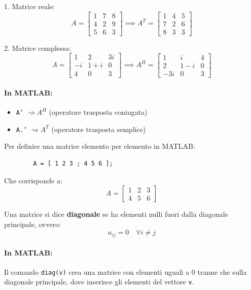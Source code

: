 \documentclass[a4paper,12pt]{article}
\begin{document}
	1. Matrice reale:
	\[
	A = \begin{bmatrix} 1 & 7 & 8 \\ 4 & 2 & 9 \\ 5 & 6 & 3 \end{bmatrix} \implies A^T = \begin{bmatrix} 1 & 4 & 5 \\ 7 & 2 & 6 \\ 8 & 3 & 3 \end{bmatrix}
	\]
	
	2. Matrice complessa:
	\[
	A = \begin{bmatrix} 1 & 2 & 3i \\ -i & 1+i & 0 \\ 4 & 0 & 3 \end{bmatrix} \implies A^H = \begin{bmatrix} 1 & i & 4 \\ 2 & 1-i & 0 \\ -3i & 0 & 3 \end{bmatrix}
	\]
	
	\paragraph{In MATLAB:}
	\begin{itemize}
		\item \texttt{A'} $\rightsquigarrow A^H$ (operatore trasposta coniugata)
		\item \texttt{A.'} $\rightsquigarrow A^T$ (operatore trasposta semplice)
	\end{itemize}
	
	Per definire una matrice elemento per elemento in MATLAB:
	\begin{verbatim}
		A = [ 1 2 3 ; 4 5 6 ];
	\end{verbatim}
	Che corrisponde a:
	\[
	A = \begin{bmatrix} 1 & 2 & 3 \\ 4 & 5 & 6 \end{bmatrix}
	\]
	\begin{tcolorbox}[title=Definizione (Matrice Diagonale)]
		Una matrice si dice \textbf{diagonale} se ha elementi nulli fuori dalla diagonale principale, ovvero:
		\[
		a_{ij} = 0 \quad \forall i \neq j
		\]
	\end{tcolorbox}
	
	\paragraph{In MATLAB:} Il comando \texttt{diag(v)} crea una matrice con elementi uguali a $0$ tranne che sulla diagonale principale, dove inserisce gli elementi del vettore \texttt{v}.
	
\end{document}

